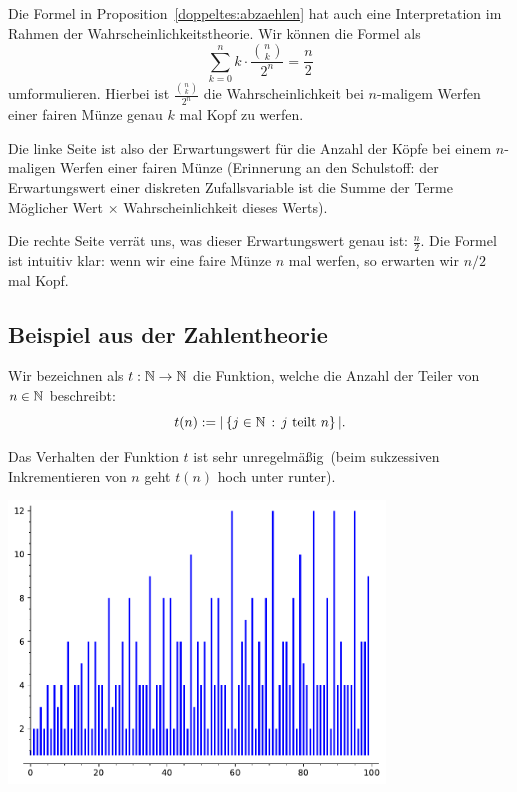 \begin{bem}
	Die Formel in Proposition~\ref{doppeltes:abzaehlen} hat auch eine Interpretation im Rahmen der Wahrscheinlichkeitstheorie. Wir können die Formel als 
	\[
		\sum_{k=0}^n k \cdot \frac{\binom{n}{k}}{2^n} =  \frac{n}{2}
	\]
	umformulieren. Hierbei ist $\frac{\binom{n}{k}}{2^n}$ die Wahrscheinlichkeit bei $n$-maligem Werfen einer fairen Münze genau $k$ mal Kopf zu werfen.
	
	 Die linke Seite ist also der Erwartungswert für die Anzahl der Köpfe bei einem $n$-maligen Werfen einer fairen Münze (Erinnerung an den Schulstoff: der Erwartungswert einer diskreten Zufallsvariable ist die Summe der Terme \glqq Möglicher Wert $\times $ Wahrscheinlichkeit dieses Werts\grqq). 
	 
	 Die rechte Seite verrät uns, was dieser Erwartungswert genau ist: $\frac{n}{2}$. Die Formel ist intuitiv klar: wenn wir eine faire Münze $n$ mal werfen, so erwarten wir $n/2$ mal Kopf. 
\end{bem} 


\subsection{Beispiel aus der Zahlentheorie} 

\begin{defn}
	Wir bezeichnen als $t : \mathbb{N} \to \mathbb{N}$ die Funktion, welche die Anzahl der Teiler von $n \in \mathbb{N}$ beschreibt:
	\[
			t(n) := | \setcond{j \in \N}{j  \ \text{teilt} \ n} |.
	\]
\end{defn}

\begin{bem}
	Das Verhalten der Funktion $t$ ist sehr \glqq unregelmäßig\grqq\ (beim sukzessiven Inkrementieren von $n$ geht $t(n)$ hoch unter runter).  
	\begin{center}
			\includegraphics[width=10cm]{Pics/t_plot.pdf}
	\end{center} 
\end{bem}

